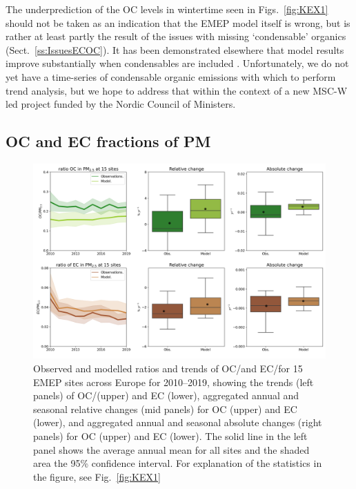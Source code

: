 The underprediction of the OC levels in wintertime seen in Figs.~\ref{fig:KEX1} should not be taken as an indication that the EMEP model itself is wrong, but is rather at least partly the result of the issues with missing `condensable' organics (Sect.~\ref{ss:IssuesECOC}). It has been demonstrated elsewhere that model results improve substantially when condensables are included \citep{DeniervanderGon2015,R2019:SVOC,R2020:SVOC}. Unfortunately, we do not yet have a time-series of condensable organic emissions with which to perform trend analysis, but we hope to address that within the context of a new MSC-W led project funded by the Nordic Council of Ministers.





\subsection{OC and EC fractions of PM}
\label{ss:OCECfrac}


\begin{figure}
\includegraphics[width=16cm]{FIGS_TRENDS/ECOC_ratio_trends.png}
 \caption{Observed and modelled ratios and trends of OC/\pmfine and EC/\pmfine for
  15 EMEP sites across Europe for 2010--2019, showing the trends
  (left panels) of OC/\pmfine (upper) and EC (lower), aggregated annual and
  seasonal relative changes (mid panels) for OC (upper) and EC (lower),
  and aggregated annual and seasonal absolute changes (right panels)
  for OC (upper) and EC (lower). The solid line in the left panel shows
  the average annual mean for all sites and the shaded area the 95\%
  confidence interval. For explanation of the statistics in the figure,
  see Fig.~\ref{fig:KEX1}
 }
\end{figure}


